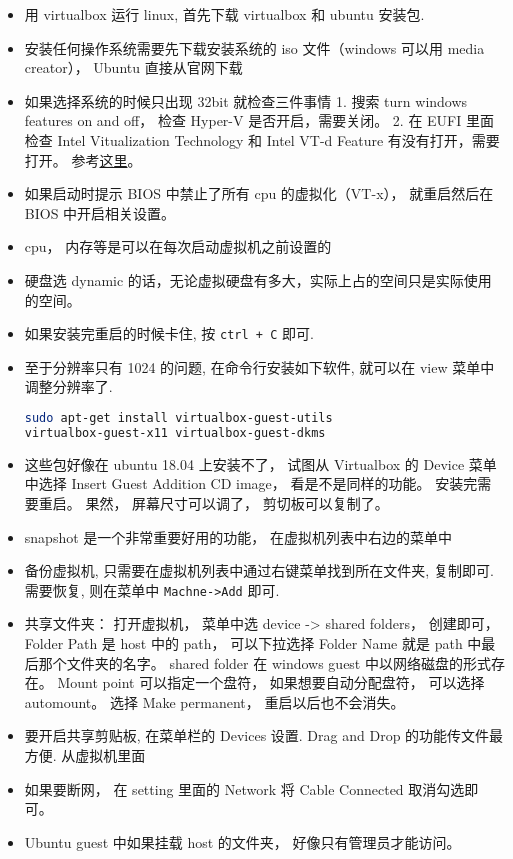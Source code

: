 \begin{itemize}
\item 用 virtualbox 运行 linux, 首先下载 virtualbox 和 ubuntu 安装包.
\item 安装任何操作系统需要先下载安装系统的 iso 文件（windows 可以用 media creator）， Ubuntu 直接从官网下载
\item 如果选择系统的时候只出现 32bit 就检查三件事情 1. 搜索 turn windows features on and off， 检查 Hyper-V 是否开启，需要关闭。 2. 在 EUFI 里面检查 Intel Vitualization Technology 和 Intel VT-d Feature 有没有打开，需要打开。 参考\href{http://www.fixedbyvonnie.com/2014/11/virtualbox-showing-32-bit-guest-versions-64-bit-host-os/}{这里}。
\item 如果启动时提示 BIOS 中禁止了所有 cpu 的虚拟化（VT-x）， 就重启然后在 BIOS 中开启相关设置。
\item cpu， 内存等是可以在每次启动虚拟机之前设置的
\item 硬盘选 dynamic 的话，无论虚拟硬盘有多大，实际上占的空间只是实际使用的空间。
\item 如果安装完重启的时候卡住, 按 \verb|ctrl + C| 即可.
\item 至于分辨率只有 1024 的问题, 在命令行安装如下软件, 就可以在 view 菜单中调整分辨率了.
\begin{lstlisting}[language=bash]
sudo apt-get install virtualbox-guest-utils
virtualbox-guest-x11 virtualbox-guest-dkms
\end{lstlisting}
\item 这些包好像在 ubuntu 18.04 上安装不了， 试图从 Virtualbox 的 Device 菜单中选择 Insert Guest Addition CD image， 看是不是同样的功能。 安装完需要重启。 果然， 屏幕尺寸可以调了， 剪切板可以复制了。
\item snapshot 是一个非常重要好用的功能， 在虚拟机列表中右边的菜单中
\item 备份虚拟机, 只需要在虚拟机列表中通过右键菜单找到所在文件夹, 复制即可. 需要恢复, 则在菜单中 \verb|Machne->Add| 即可.
\item 共享文件夹： 打开虚拟机， 菜单中选 device -> shared folders， 创建即可， Folder Path 是 host 中的 path， 可以下拉选择 Folder Name 就是 path 中最后那个文件夹的名字。 shared folder 在 windows guest 中以网络磁盘的形式存在。 Mount point 可以指定一个盘符， 如果想要自动分配盘符， 可以选择 automount。 选择 Make permanent， 重启以后也不会消失。
\item 要开启共享剪贴板, 在菜单栏的 Devices 设置. Drag and Drop 的功能传文件最方便. 从虚拟机里面
\item 如果要断网， 在 setting 里面的 Network 将 Cable Connected 取消勾选即可。
\item Ubuntu guest 中如果挂载 host 的文件夹， 好像只有管理员才能访问。
\end{itemize}


